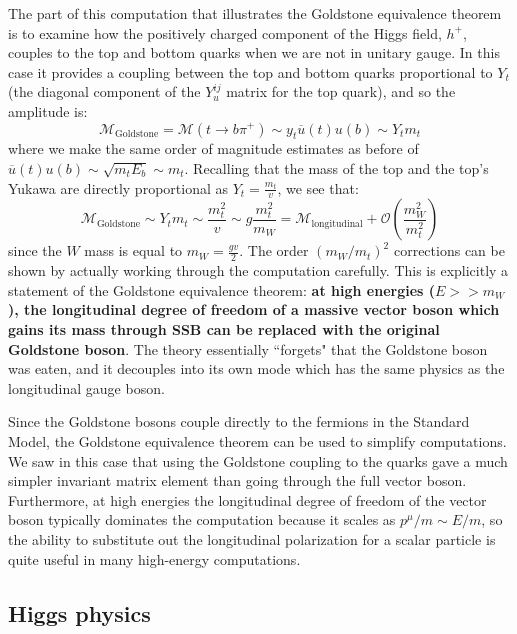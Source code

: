 \documentclass[11pt, oneside]{article}   	%
\theoremstyle{definition}
\numberwithin{equation}{subsection}		%
\begin{document}
The part of this computation that illustrates the Goldstone equivalence theorem is to examine how the positively charged component of the 
Higgs field, $h^+$, couples to the top and bottom quarks when we are not in unitary gauge. In this case it provides a coupling between the 
top and bottom quarks proportional to $Y_t$ (the diagonal component of the $Y_u^{ij}$ matrix for the top quark), and so the amplitude is:
\begin{equation}
	\mathcal M_\mathrm{Goldstone} = \mathcal M(t\rightarrow b \pi^+)\sim y_t \overline u(t) u(b)\sim Y_t m_t
\end{equation}
where we make the same order of magnitude estimates as before of $\overline u(t) u(b)\sim \sqrt{m_t E_b}\sim m_t$. Recalling that the 
mass of the top and the top's Yukawa are directly proportional as $Y_t = \frac{m_t}{v}$, we see that:
\begin{equation}
	\mathcal M_\mathrm{Goldstone}\sim Y_t m_t \sim \frac{m_t^2}{v}\sim g\frac{m_t^2}{m_W} = \mathcal M_\mathrm{longitudinal} + \mathcal O\left(\frac{m_W^2}{m_t^2}\right)
\end{equation}
since the $W$ mass is equal to $m_W = \frac{gv}{2}$. The order $(m_W / m_t)^2$ corrections can be shown by actually working through the 
computation carefully. This is explicitly a statement of the Goldstone equivalence theorem: \textbf{at high energies ($E >> m_W$), the 
longitudinal degree of freedom of a massive vector boson which gains its mass through SSB can be replaced with the original Goldstone 
boson}. The theory essentially ``forgets" that the Goldstone boson was eaten, and it decouples into its own mode which has the same 
physics as the longitudinal gauge boson. 

Since the Goldstone bosons couple directly to the fermions in the Standard Model, the Goldstone equivalence theorem can be used to 
simplify computations. We saw in this case that using the Goldstone coupling to the quarks gave a much simpler invariant matrix element 
than going through the full vector boson. Furthermore, at high energies the longitudinal degree of freedom of the vector boson typically 
dominates the computation because it scales as $p^\mu / m\sim E / m$, so the ability to substitute out the longitudinal polarization for a 
scalar particle is quite useful in many high-energy computations. 

\subsection{Higgs physics}
\end{document}
